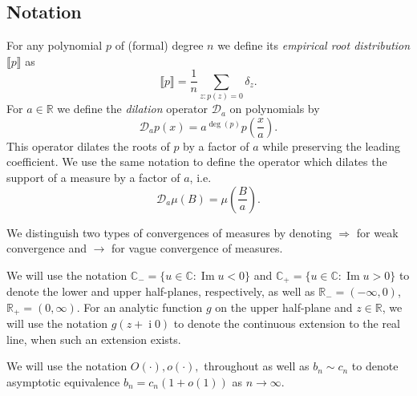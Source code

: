 \documentclass[reqno]{amsart}
\newcommand{\1}{\mathbf{1}}
\DeclareMathOperator{\ii}{i}
\newcommand{\C}{\mathbb{C}}
\renewcommand\Im{\operatorname{Im}}
\newcommand{\R}{\mathbb{R}}
\def\R{\mathbb{R}}
\theoremstyle{plain}
\theoremstyle{definition}
\theoremstyle{remark}
\numberwithin{equation}{section}
\begin{document}
\subsection{Notation}
	For any polynomial $p$  of (formal) degree $n$  we define its \emph{empirical root distribution} $\llbracket p\rrbracket$ as \begin{equation}\label{eq:ERM}
		\llbracket p\rrbracket=\frac{1}{n}\sum_{z:p(z)=0}\delta_{z}.
	\end{equation} For $a\in\R$ we define the \emph{dilation} operator $\mathcal{D}_{a}$ on polynomials by \begin{equation}
	\mathcal{D}_{a}p(x)=a^{\deg(p)}p\left(\frac{x}{a}\right).
\end{equation} This operator dilates the roots of $p$ by a factor of $a$ while preserving the leading coefficient. We use the same notation to define the operator which dilates the support of a measure by a factor of $a$, i.e.\ \begin{equation}
\mathcal{D}_{a}\mu(B)=\mu\left(\frac{B}{a}\right).
\end{equation} 


We distinguish two types of convergences of measures by denoting $\Rightarrow$ for weak convergence and $\rightarrow$ for vague convergence of measures.


We will use the notation $\C_-=\{u\in\C: \Im u<0\}$ and $\C_{+}=\{u\in\C:\Im u>0 \}$ to denote the lower and upper half-planes, respectively, as well as $\R_-=(-\infty,0)$, $\R_+=(0,\infty)$. 
For an analytic function $g$ on the upper half-plane and $z\in\R$, we will use the notation $g(z+\ii0)$ to denote the continuous extension to the real line, when such an extension exists. 

We will use the notation $O(\cdot), o(\cdot),$ throughout as well as $b_n\sim c_n$ to denote asymptotic equivalence ${b_n}={c_n} (1+o(1))$ as $n\rightarrow\infty$. 
\end{document}
